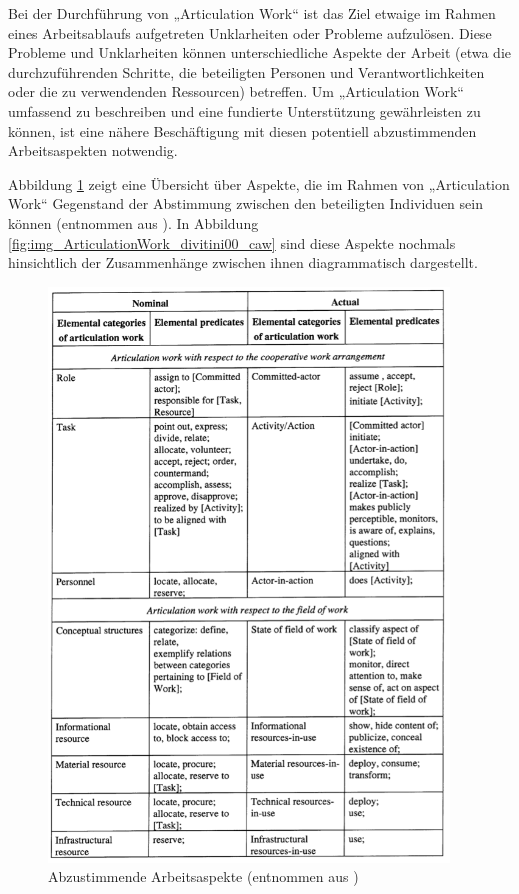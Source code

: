 Bei der Durchführung von „Articulation Work“ ist das Ziel etwaige im Rahmen eines Arbeitsablaufs aufgetreten Unklarheiten oder Probleme aufzulösen. Diese Probleme und Unklarheiten können unterschiedliche Aspekte der Arbeit (etwa die durchzuführenden Schritte, die beteiligten Personen und Verantwortlichkeiten oder die zu verwendenden Ressourcen) betreffen. Um „Articulation Work“ umfassend zu beschreiben und eine fundierte Unterstützung gewährleisten zu können, ist eine nähere Beschäftigung mit diesen potentiell abzustimmenden Arbeitsaspekten notwendig.

Abbildung \ref{fig:img_ArticulationWork_schmidt96-articulation-categories} zeigt eine Übersicht über Aspekte, die im Rahmen von „Articulation Work“ Gegenstand der Abstimmung zwischen den beteiligten Individuen sein können (entnommen aus \citep{Schmidt96}). In Abbildung \ref{fig:img_ArticulationWork_divitini00_caw} sind diese Aspekte nochmals hinsichtlich der Zusammenhänge zwischen ihnen diagrammatisch dargestellt.

\begin{figure}[htbp]
	\centering
	\includegraphics[height=6in]{img/ArticulationWork/schmidt96-articulation-categories.png}
	\caption[Abzustimmende Arbeitsaspekte]{Abzustimmende Arbeitsaspekte (entnommen aus \citep{Schmidt96})}
	\label{fig:img_ArticulationWork_schmidt96-articulation-categories}
\end{figure}


